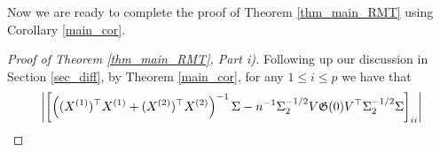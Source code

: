 
Now we are ready to complete the proof of Theorem \ref{thm_main_RMT} using Corollary \ref{main_cor}.

\begin{proof}[Proof of Theorem \ref{thm_main_RMT}, Part i)]
Following up our discussion in Section \ref{sec_diff}, by Theorem \ref{main_cor}, for any $1\le i \le p$ we have that
\begin{align}
& \left| \left[\left((X^{(1)})^\top X^{(1)}+(X^{(2)})^\top X^{(2)}\right)^{-1}\Sigma - n^{-1}  \Sigma_2^{-1/2}V \Gi(0)V^\top\Sigma_2^{-1/2}\Sigma\right]_{ii}\right| \nonumber\\

\end{align}
\end{proof}
